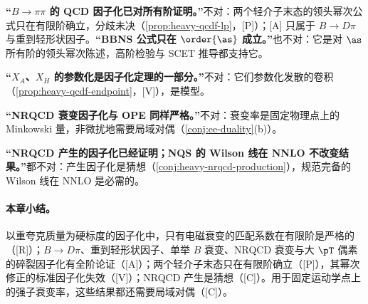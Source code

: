 \begin{tcolorbox}[enhanced,breakable,title=常见误解,fonttitle=\bfseries,
  colback=gray!3!white,colframe=gray!55!black,boxrule=0.6pt,arc=2pt,
  left=5pt,right=5pt,top=3pt,bottom=3pt,before skip=6pt,after skip=6pt]
\textbf{“$B\to\pi\pi$ 的 QCD 因子化已对所有阶证明。”}不对：两个轻介子末态的领头幂次公式只在有限阶确立，分歧未决（\cref{prop:heavy-qcdf-lp}，[P]）；[A] 只属于 $B\to D\pi$ 与重到轻形状因子。\textbf{“BBNS 公式只在 $\order{\as}$ 成立。”}也不对：它是对 $\as$ 所有阶的领头幂次陈述，高阶检验与 SCET 推导都支持它。\par
\textbf{“$X_A$、$X_H$ 的参数化是因子化定理的一部分。”}不对：它们参数化发散的卷积（\cref{prop:heavy-qcdf-endpoint}，[V]），是模型。\par
\textbf{“NRQCD 衰变因子化与 OPE 同样严格。”}不对：衰变率是固定物理点上的 Minkowski 量，非微扰地需要局域对偶（\cref{conj:ee-duality}(b)）。\par
\textbf{“NRQCD 产生的因子化已经证明；NQS 的 Wilson 线在 NNLO 不改变结果。”}都不对：产生因子化是猜想（\cref{conj:heavy-nrqcd-production}），规范完备的 Wilson 线在 NNLO 是必需的。
\end{tcolorbox}

\paragraph{本章小结。}
以重夸克质量为硬标度的因子化中，只有电磁衰变的匹配系数在有限阶是严格的（[R]）；$B\to D\pi$、重到轻形状因子、单举 $B$ 衰变、NRQCD 衰变与大 $\pT$ 偶素的碎裂因子化有全阶论证（[A]）；两个轻介子末态只在有限阶确立（[P]），其幂次修正的标准因子化失效（[V]）；NRQCD 产生是猜想（[C]）。用于固定运动学点上的强子衰变率，这些结果都还需要局域对偶（[C]）。
